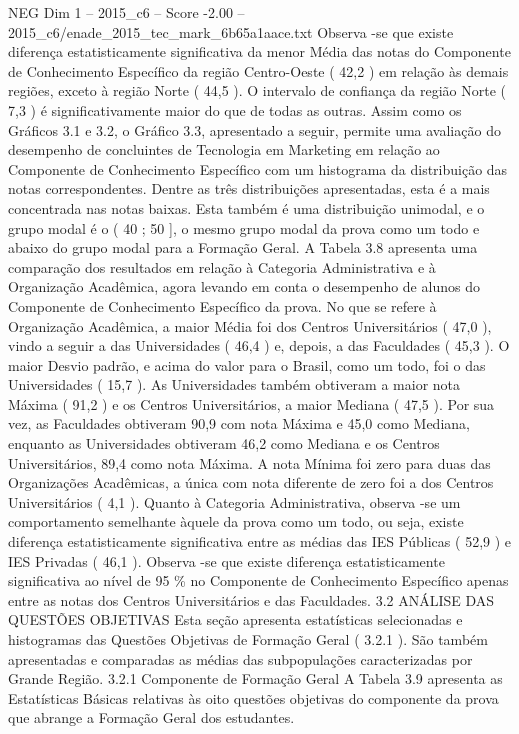 \begin{textsample}{NEG Dim 1 – 2015\_c6 – Score -2.00 – 2015\_c6/enade\_2015\_tec\_mark\_6b65a1aace.txt}
Observa -se que existe diferença estatisticamente significativa da menor Média das notas do Componente de Conhecimento Específico da região Centro-Oeste ( 42,2 ) em relação às demais regiões, exceto à região Norte ( 44,5 ).
O intervalo de confiança da região Norte ( 7,3 ) é significativamente maior do que de todas as outras.
Assim como os Gráficos 3.1 e 3.2, o Gráfico 3.3, apresentado a seguir, permite uma avaliação do desempenho de concluintes de Tecnologia em Marketing em relação ao Componente de Conhecimento Específico com um histograma da distribuição das notas correspondentes.
Dentre as três distribuições apresentadas, esta é a mais concentrada nas notas baixas.
Esta também é uma distribuição unimodal, e o grupo modal é o ( 40 ; 50 ], o mesmo grupo modal da prova como um todo e abaixo do grupo modal para a Formação Geral.
A Tabela 3.8 apresenta uma comparação dos resultados em relação à Categoria Administrativa e à Organização Acadêmica, agora levando em conta o desempenho de alunos do Componente de Conhecimento Específico da prova.
No que se refere à Organização Acadêmica, a maior Média foi dos Centros Universitários ( 47,0 ), vindo a seguir a das Universidades ( 46,4 ) e, depois, a das Faculdades ( 45,3 ).
O maior Desvio padrão, e acima do valor para o Brasil, como um todo, foi o das Universidades ( 15,7 ).
As Universidades também obtiveram a maior nota Máxima ( 91,2 ) e os Centros Universitários, a maior Mediana ( 47,5 ).
Por sua vez, as Faculdades obtiveram 90,9 com nota Máxima e 45,0 como Mediana, enquanto as Universidades obtiveram 46,2 como Mediana e os Centros Universitários, 89,4 como nota Máxima.
A nota Mínima foi zero para duas das Organizações Acadêmicas, a única com nota diferente de zero foi a dos Centros Universitários ( 4,1 ).
Quanto à Categoria Administrativa, observa -se um comportamento semelhante àquele da prova como um todo, ou seja, existe diferença estatisticamente significativa entre as médias das IES Públicas ( 52,9 ) e IES Privadas ( 46,1 ).
Observa -se que existe diferença estatisticamente significativa ao nível de 95 \% no Componente de Conhecimento Específico apenas entre as notas dos Centros Universitários e das Faculdades. 3.2 ANÁLISE DAS QUESTÕES OBJETIVAS Esta seção apresenta estatísticas selecionadas e histogramas das Questões Objetivas de Formação Geral ( 3.2.1 ).
São também apresentadas e comparadas as médias das subpopulações caracterizadas por Grande Região. 3.2.1 Componente de Formação Geral A Tabela 3.9 apresenta as Estatísticas Básicas relativas às oito questões objetivas do componente da prova que abrange a Formação Geral dos estudantes.

\end{textsample}
